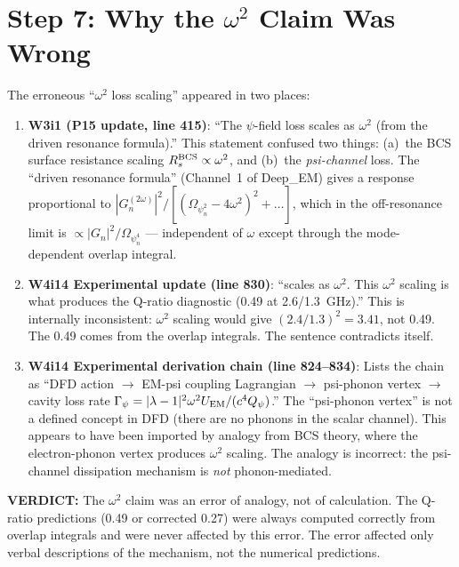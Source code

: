 \documentclass[11pt]{article}
\newcommand{\Qpsi}{Q_\psi}
\newcommand{\Opsi}{\Omega_\psi}
\newcommand{\verdict}[1]{\textcolor{green!50!black}{\textbf{VERDICT:} #1}}
\theoremstyle{definition}
\theoremstyle{remark}
\begin{document}
\section{Step 7: Why the $\omega^2$ Claim Was Wrong}
\label{sec:why-wrong}

The erroneous ``$\omega^2$ loss scaling'' appeared in two places:

\begin{enumerate}
\item \textbf{W3i1 (P15 update, line 415)}: ``The $\psi$-field loss
  scales as $\omega^2$ (from the driven resonance formula).'' This
  statement confused two things: (a)~the BCS surface resistance
  scaling $R_s^{\rm BCS} \propto \omega^2$, and (b)~the
  \emph{psi-channel} loss. The ``driven resonance formula'' (Channel~1
  of Deep\_EM) gives a response proportional to $|G_n^{(2\omega)}|^2
  / [(\Opsi_n^2 - 4\omega^2)^2 + \ldots]$, which in the off-resonance
  limit is $\propto |G_n|^2 / \Opsi_n^4$ --- independent of $\omega$
  except through the mode-dependent overlap integral.

\item \textbf{W4i14 Experimental update (line 830)}: ``scales as
  $\omega^2$. This $\omega^2$ scaling is what produces the Q-ratio
  diagnostic (0.49 at 2.6/1.3~GHz).'' This is internally inconsistent:
  $\omega^2$ scaling would give $(2.4/1.3)^2 = 3.41$, not 0.49. The
  0.49 comes from the overlap integrals. The sentence contradicts
  itself.

\item \textbf{W4i14 Experimental derivation chain (line 824--834)}:
  Lists the chain as ``DFD action $\to$ EM-psi coupling Lagrangian
  $\to$ psi-phonon vertex $\to$ cavity loss rate $\Gamma_\psi =
  |\lambda-1|^2\omega^2 U_{\rm EM}/(c^4 \Qpsi)$.'' The
  ``psi-phonon vertex'' is not a defined concept in DFD (there are
  no phonons in the scalar channel). This appears to have been
  imported by analogy from BCS theory, where the electron-phonon
  vertex produces $\omega^2$ scaling. The analogy is incorrect:
  the psi-channel dissipation mechanism is \emph{not} phonon-mediated.
\end{enumerate}

\verdict{The $\omega^2$ claim was an error of analogy, not of
calculation. The Q-ratio predictions (0.49 or corrected 0.27) were
always computed correctly from overlap integrals and were never
affected by this error. The error affected only verbal descriptions
of the mechanism, not the numerical predictions.}
\end{document}
